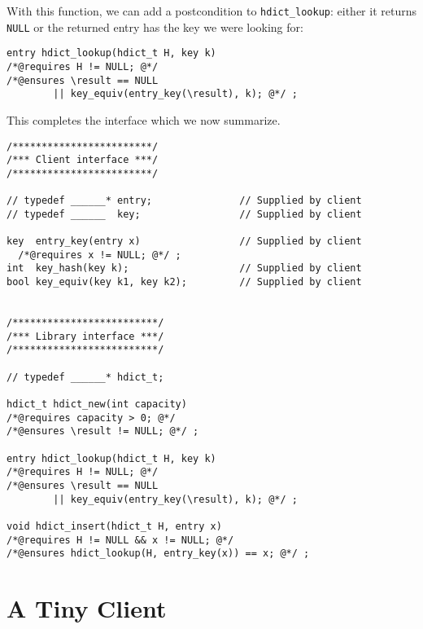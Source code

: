 \begin{enumerate}
With this function, we can add a postcondition to
\lstinline'hdict_lookup': either it returns \lstinline'NULL' or the
returned entry has the key we were looking for:
\begin{lstlisting}[language={[C0]C}]
entry hdict_lookup(hdict_t H, key k)
/*@requires H != NULL; @*/
/*@ensures \result == NULL
        || key_equiv(entry_key(\result), k); @*/ ;
\end{lstlisting}
\end{enumerate}

This completes the interface which we now summarize.


\begin{lstlisting}[language={[C0]C}]
/************************/
/*** Client interface ***/
/************************/

// typedef ______* entry;               // Supplied by client
// typedef ______  key;                 // Supplied by client

key  entry_key(entry x)                 // Supplied by client
  /*@requires x != NULL; @*/ ;
int  key_hash(key k);                   // Supplied by client
bool key_equiv(key k1, key k2);         // Supplied by client


/*************************/
/*** Library interface ***/
/*************************/

// typedef ______* hdict_t;

hdict_t hdict_new(int capacity)
/*@requires capacity > 0; @*/
/*@ensures \result != NULL; @*/ ;

entry hdict_lookup(hdict_t H, key k)
/*@requires H != NULL; @*/
/*@ensures \result == NULL
        || key_equiv(entry_key(\result), k); @*/ ;

void hdict_insert(hdict_t H, entry x)
/*@requires H != NULL && x != NULL; @*/
/*@ensures hdict_lookup(H, entry_key(x)) == x; @*/ ;
\end{lstlisting}


\clearpage
\section{A Tiny Client}
\label{sec:hdict:sample_client}

